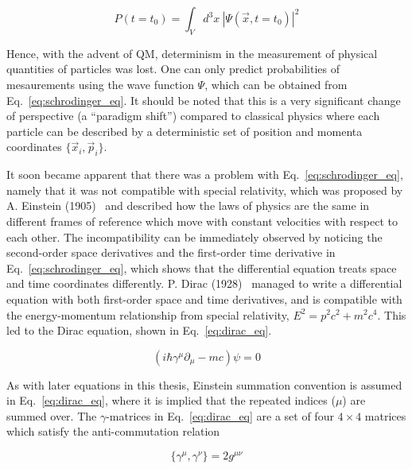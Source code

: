 \begin{equation}
    P(t=t_0)  = \int_{V} d^3 x \ |\Psi(\vec{x}, t=t_0)|^2 
\end{equation}

Hence, with the advent of QM, determinism in the measurement of physical quantities of particles was lost.
One can only predict probabilities of mesaurements using the wave function $\Psi$, which can
be obtained from Eq.~\ref{eq:schrodinger_eq}. It should be noted that this is a very significant change 
of perspective (a ``paradigm shift'') compared to classical physics where each particle can be described
by a deterministic set of position and momenta coordinates $\{\vec{x}_i, \vec{p}_i\}$. 

It soon became apparent that there was a problem with Eq.~\ref{eq:schrodinger_eq}, namely that it was not compatible
with special relativity, which was proposed by A. Einstein (1905)~\cite{Einstein:1905ve} 
and described how the laws of physics are the same
in different frames of reference which move with constant velocities with respect to each other. The incompatibility
can be immediately observed by noticing the second-order space derivatives and the first-order time derivative in
Eq.~\ref{eq:schrodinger_eq}, which shows that the differential equation treats space and time coordinates differently.
P. Dirac (1928)~\cite{Dirac:1928hu} managed to write a differential equation with both first-order space and 
time derivatives, and is compatible
with the energy-momentum relationship from special relativity, $E^2 = p^2 c^2 + m^2 c^4$. This led to the Dirac equation,
shown in Eq.~\ref{eq:dirac_eq}.

\begin{equation}
    \left( i\hbar \gamma^{\mu} \partial_{\mu} - mc \right) \psi = 0
    \label{eq:dirac_eq}
\end{equation}

As with later equations in this thesis, Einstein summation convention is assumed in Eq.~\ref{eq:dirac_eq},
where it is implied that the repeated indices ($\mu$) are summed over.
The $\gamma$-matrices in Eq.~\ref{eq:dirac_eq} are a set of four $4\times 4$ matrices 
which satisfy the anti-commutation relation

\begin{equation}
    \{\gamma^{\mu}, \gamma^{\nu} \} = 2g^{\mu\nu}
    \label{eq:gamma_matrices_anticomm}
\end{equation}

